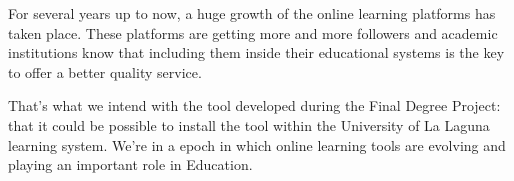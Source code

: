 



For several years up to now, a huge growth of the online learning platforms has taken place. 
These platforms are getting more and more followers and
academic institutions know that including them inside their educational systems is the key to offer a better quality service.


That's what we intend with the tool developed during the Final Degree Project: that it could be possible to install the tool within the University of La Laguna learning system.
We're in a epoch in which online learning tools are evolving and playing an important role in Education.
\bigskip

